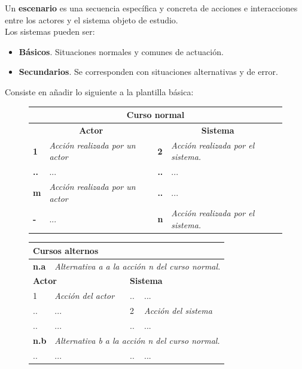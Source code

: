 \documentclass[12pt,spanish]{article}
\begin{document}
Un \textbf{escenario} es una secuencia específica y concreta de acciones e interacciones entre los actores y el sistema objeto de estudio. \\

Los sistemas pueden ser:
\begin{itemize}
	\item \textbf{Básicos}. Situaciones normales y comunes de actuación.
	\item \textbf{Secundarios}. Se corresponden con situaciones alternativas y de error.
\end{itemize}

Consiste en añadir lo siguiente a la plantilla básica: 

\begin{figure}[H]
\centering
\begin{tabular}{|m{5pt}|m{7.33cm}|m{5pt}|m{7.33cm}|}
\hline
\multicolumn{4}{|c|}{\textbf{Curso normal}} \\
\hline
\multicolumn{2}{|c}{\textbf{Actor}} & \multicolumn{2}{|c|}{\textbf{Sistema}} \\
\hline
\textbf{1} & \textit{Acción realizada por un actor} & \textbf{2} & \textit{Acción realizada por el sistema.} \\
\hline
\textbf{..} & ... & \textbf{..} & ... \\
\hline
\textbf{\footnotesize{m}} & \textit{Acción realizada por un actor} & \textbf{..} & ... \\
\hline
\textbf{-} & ... & \textbf{n} & \textit{Acción realizada por el sistema.} \\
\hline

\end{tabular}

\vspace{0.5cm}

\begin{tabular}{|m{15pt}|m{7.15cm}|m{6pt}|m{7.15cm}|}
\hline
\multicolumn{4}{|m{16.2cm}|}{\textbf{Cursos alternos}} \\
\hline
\textbf{n.a} & \multicolumn{3}{l|}{\textit{Alternativa \emph{a} a la acción n del curso normal.}}  \\
\hline
\multicolumn{2}{|m{7.2cm}}{\textbf{Actor}} & \multicolumn{2}{|m{7.2cm}|}{\textbf{Sistema}} \\
\hline
1 & \textit{Acción del actor} & .. & ... \\
\hline
.. & ... & 2 & \textit{Acción del sistema} \\
\hline
.. & ... & .. & ... \\
\hline
\textbf{n.b} & \multicolumn{3}{l|}{\textit{Alternativa \emph{b} a la acción n del curso normal.}}  \\
\hline
.. & ... & .. & ... \\
\hline
\end{tabular}


\end{figure}
\end{document}
